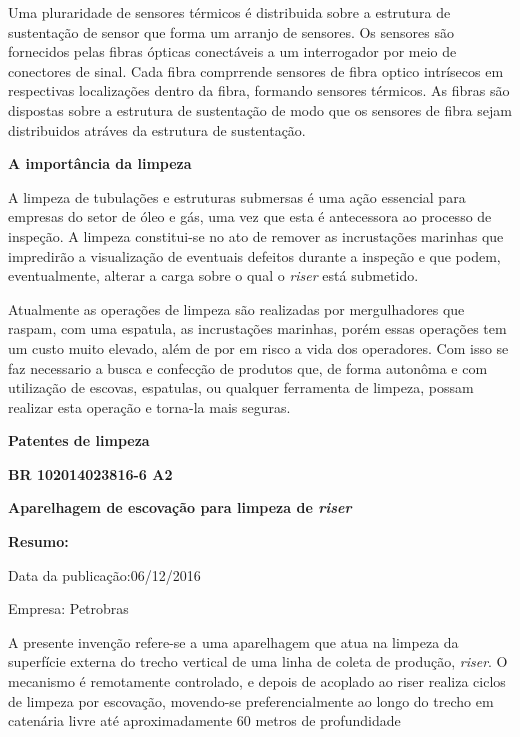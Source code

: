 \documentclass[a4paper,12pt]{article}
\begin{document}
Uma pluraridade de sensores térmicos é distribuida sobre a estrutura de sustentação de sensor que forma um arranjo de sensores. Os sensores são fornecidos pelas fibras ópticas conectáveis a um interrogador por meio de conectores de sinal. Cada fibra comprrende sensores de fibra optico intrísecos em respectivas localizações dentro da fibra, formando sensores térmicos. As fibras são dispostas sobre a estrutura de sustentação de modo que os sensores de fibra sejam distribuidos atráves da estrutura de sustentação.

\vspace{1,0cm}
\hspace{-0,75cm}
\textbf{A importância da limpeza}
\vspace{1,0cm}

A limpeza de tubulações e estruturas submersas é uma ação essencial para empresas do setor de óleo e gás, uma vez que esta é antecessora ao processo de inspeção. A limpeza constitui-se no ato de remover as incrustações marinhas que impredirão a visualização de eventuais defeitos durante a inspeção e que podem, eventualmente, alterar a carga sobre o qual o \textit{riser} está submetido.

Atualmente as operações de limpeza são realizadas por mergulhadores que raspam, com uma espatula, as incrustações marinhas, porém essas operações tem um custo muito elevado, além de por em risco a vida dos operadores. Com isso se faz necessario a busca e confecção de produtos que, de forma  autonôma e com utilização de escovas, espatulas, ou qualquer ferramenta de limpeza, possam realizar esta operação e torna-la mais seguras.

\vspace{1,0cm}
\hspace{-0,75cm}
 \textbf{Patentes de limpeza}
 
 \vspace{1,0cm}
 \begin{center}
  \textbf{BR 102014023816-6 A2} 
 
 \textbf{Aparelhagem de escovação para limpeza de \textit{riser}}
 \end{center}
 
 \textbf{Resumo:}
 
 Data da publicação:06/12/2016
 
 Empresa: Petrobras
 
 \vspace{1,0cm}
 
 A presente invenção refere-se a uma aparelhagem que atua na
limpeza da superfície externa do trecho vertical de uma linha de coleta de
produção, \textit{riser}. O mecanismo é remotamente controlado, e depois de acoplado ao riser realiza ciclos de limpeza por escovação, movendo-se preferencialmente ao longo do trecho em catenária livre até aproximadamente 60 metros de profundidade
\end{document}
